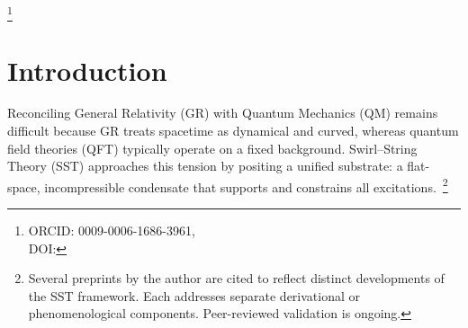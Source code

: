\documentclass[10pt,reprint,aps,onecolumn,nofootinbib]{revtex4-2}
\begin{document}
\title{\papertitle}
\author{Omar Iskandarani}
\thanks{ORCID: 0009-0006-1686-3961, \\ DOI: \paperdoi}
\date{\today}

\begin{abstract}
We present \emph{Swirl--String Theory} (SST), a fluid–topological framework in which matter and radiation are modeled as quantized vortex loops (“swirl strings”) in an incompressible, non-dissipative condensate. Within SST, classical gravitational phenomenology \emph{emerges} as a collective pressure effect in flat space, while local swirl flows \emph{recover} relativistic time-dilation kinematics. We formulate a covariant effective field theory on a preferred foliation, show how topological quantization organizes a discrete particle spectrum, and outline a route by which gauge structures may be \emph{derived} from orientational textures of the medium. A modified Faraday law is proposed in which time-varying swirl areal density sources an electromotive impulse; this yields geometry-independent, quantized flux signatures that serve as explicit falsification targets. Wave–particle duality is described via R/T phase dynamics (unknotted vs.\ knotted states), with measurement modeled as an R$\leftrightarrow$T transition. We compare SST with Kelvin’s vortex lineage, analogue-gravity programs, and emergent-gauge constructions, emphasizing where SST \emph{recovers} established limits (Newtonian gravity, Maxwell electrodynamics, quantum interference) and where it \emph{predicts} deviations that are testable in BECs, superconducting films, and attosecond spectroscopy. All equations use SI units with dimensional checks. Our aim is a parameter-light, topological account that complements standard formulations and invites direct experimental appraisal.
\emph{Keywords:} vortex dynamics; topological fluid; emergent gauge theory; time dilation; quantum measurement; attosecond spectroscopy
\end{abstract}
\maketitle

\section{Introduction}\label{sec:intro}
    Reconciling General Relativity (GR) with Quantum Mechanics (QM) remains difficult because GR treats spacetime as dynamical and curved, whereas quantum field theories (QFT) typically operate on a fixed background. Swirl–String Theory (SST) approaches this tension by positing a unified substrate: a flat-space, incompressible condensate that supports and constrains all excitations.~\footnote{Several preprints by the author are cited to reflect distinct developments of the SST framework. Each addresses separate derivational or phenomenological components. Peer-reviewed validation is ongoing.}
\end{document}
